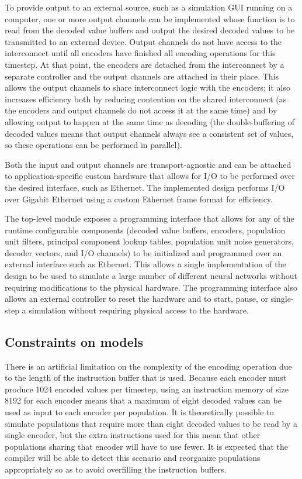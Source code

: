 \documentclass[english]{article}
\begin{document}
To provide output to an external source, such as a simulation GUI running on a computer, one or more output channels
can be implemented whose function is to read from the decoded value buffers and output the desired decoded values to be transmitted
to an external device. Output channels do not have access to the interconnect until all encoders have finished all
encoding operations for this timestep. At that point, the encoders are detached from the interconnect by a separate controller and the output
channels are attached in their place. This allows the output channels to share interconnect logic with the encoders;
it also increases efficiency both by reducing contention on the shared interconnect (as the encoders and output channels
do not access it at the same time) and by allowing output to happen at the same time as decoding
(the double-buffering of decoded values means that output channels always see a consistent set of values,
so these operations can be performed in parallel).

Both the input and output channels are transport-agnostic and can be attached to application-specific custom hardware that allows for
I/O to be performed over the desired interface, such as Ethernet. The implemented design performs I/O over Gigabit Ethernet using a custom Ethernet frame format for efficiency.

The top-level module exposes a programming interface that allows for any of the runtime configurable components
(decoded value buffers, encoders, population unit filters, principal component lookup tables,
population unit noise generators, decoder vectors, and I/O channels) to be initialized and programmed
over an external interface such as Ethernet. This allows a single implementation of the design
to be used to simulate a large number of different neural networks without requiring modifications to the physical hardware.
The programming interface also allows an external controller to reset the hardware and to start, pause, or single-step a simulation
without requiring physical access to the hardware.

\subsection{Constraints on models}

There is an artificial limitation on the complexity of the encoding operation due to the length of the instruction buffer that is used.
Because each encoder must produce 1024 encoded values per timestep, using an instruction memory of size 8192 for each encoder means that a maximum of eight decoded values
can be used as input to each encoder per population.
It is theoretically possible to simulate populations that require more than eight decoded values to be read by a single encoder,
but the extra instructions used for this mean that other populations sharing that encoder will have to use fewer.
It is expected that the compiler will be able to detect this scenario and reorganize populations appropriately so as to avoid overfilling the instruction buffers.
\end{document}
